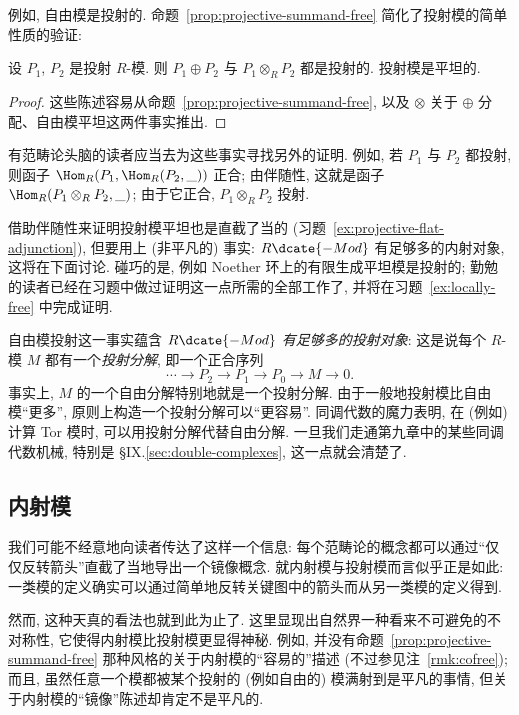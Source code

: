例如, 自由模是投射的. 命题~\ref{prop:projective-summand-free} 简化了投射模的简单性质的验证:

\begin{corollary}\label{cor:projective-sums-flat}
设 $P_1$, $P_2$ 是投射 $R$-模. 则 $P_1\oplus P_2$ 与 $P_1\otimes_R P_2$ 都是投射的. 投射模是平坦的.
\end{corollary}

\begin{proof}
这些陈述容易从命题~\ref{prop:projective-summand-free}, 以及 $\otimes$ 关于 $\oplus$ 分配、自由模平坦这两件事实推出.
\end{proof}

有范畴论头脑的读者应当去为这些事实寻找另外的证明. 例如, 若 $P_1$ 与 $P_2$ 都投射, 则函子 $\Hom_R(P_1,\Hom_R(P_2,\_))$ 正合; 由伴随性, 这就是函子 $\Hom_R(P_1\otimes_R P_2,\_)$; 由于它正合, $P_1\otimes_R P_2$ 投射.

借助伴随性来证明投射模平坦也是直截了当的 (习题~\ref{ex:projective-flat-adjunction}), 但要用上 (非平凡的) 事实: $R\dcate{-Mod}$ 有足够多的内射对象, 这将在下面讨论. 碰巧的是, 例如 Noether 环上的有限生成平坦模是投射的; 勤勉的读者已经在习题中做过证明这一点所需的全部工作了, 并将在习题~\ref{ex:locally-free} 中完成证明.

自由模投射这一事实蕴含 $R\dcate{-Mod}$ \emph{有足够多的投射对象}: 这是说每个 $R$-模 $M$ 都有一个\emph{投射分解}, 即一个正合序列
\[
\cdots\longrightarrow P_2\longrightarrow P_1\longrightarrow P_0\longrightarrow M\longrightarrow 0.
\]
事实上, $M$ 的一个自由分解特别地就是一个投射分解. 由于一般地投射模比自由模``更多'', 原则上构造一个投射分解可以``更容易''. 同调代数的魔力表明, 在 (例如) 计算 Tor 模时, 可以用投射分解代替自由分解. 一旦我们走通第九章中的某些同调代数机械, 特别是 §IX.\ref{sec:double-complexes}, 这一点就会清楚了.

\subsection{内射模}\label{subsec:injective-modules}

我们可能不经意地向读者传达了这样一个信息: 每个范畴论的概念都可以通过``仅仅反转箭头''直截了当地导出一个镜像概念. 就内射模与投射模而言似乎正是如此: 一类模的定义确实可以通过简单地反转关键图中的箭头而从另一类模的定义得到.

然而, 这种天真的看法也就到此为止了. 这里显现出自然界一种看来不可避免的不对称性, 它使得内射模比投射模更显得神秘. 例如, 并没有命题~\ref{prop:projective-summand-free} 那种风格的关于内射模的``容易的''描述 (不过参见注~\ref{rmk:cofree}); 而且, 虽然任意一个模都被某个投射的 (例如自由的) 模满射到是平凡的事情, 但关于内射模的``镜像''陈述却肯定不是平凡的.

